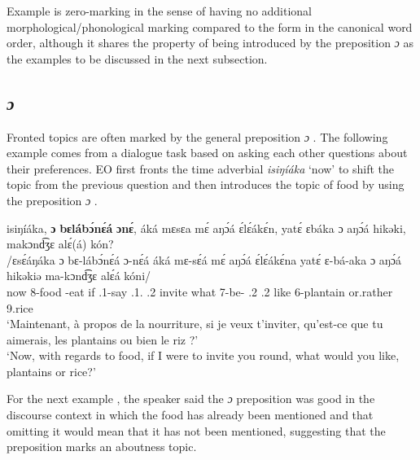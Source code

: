 \documentclass[output=paper,colorlinks,citecolor=brown
]{langscibook}
\begin{document}
\z

Example  is zero-marking in the sense of having no additional morphological\slash phonological marking compared to the form in the canonical word order, although it shares the property of being introduced by the preposition \textit{ɔ} as the examples to be discussed in the next subsection.

\subsection{\textit{ɔ}}

Fronted topics are often marked by the general preposition \textit{ɔ} \PREP{}. The following example comes from a dialogue task based on asking each other questions about their preferences. EO first fronts the time adverbial \textit{isiŋíáka} `now' to shift the topic from the previous question and then introduces the topic of food by using the preposition \textit{ɔ} .

\ea
\label{alternativeqplantainrice}
\glll
{\db}isiŋíáka, \textbf{ɔ} \textbf{bɛlábɔ́nɛ́á} \textbf{ɔnɛ́}, áká mɛsɛa mɛ́ aŋɔ́á ɛ́lɛ́ákɛ́n, yatɛ́ ɛbáka ɔ aŋɔ́á hikəki, makɔnd͡ʒɛ alɛ́(á) kón? \\
/ɛsɛ́áŋáka ɔ bɛ-lábɔ́nɛ́á ɔ-nɛ́á áká mɛ-sɛ́á mɛ́ aŋɔ́á ɛ́lɛ́ákɛ́na yatɛ́ ɛ-bá-aka ɔ aŋɔ́á hikəkiə ma-kɔnd͡ʒɛ alɛ́á kóni/ \\
{\db}now \PREP{} 8-food \INF{}-eat if \SM{}.1\SG{}-say \SM{}.1\SG{}.\SBJV{} \PRO{}.2\SG{} invite what 7\SM{}-be-\DUR{} \SM{}.2\SG{} \PRO{}.2\SG{} like 6-plantain or.rather 9.rice \\
\glt
`Maintenant, à propos de la nourriture, si je veux t'inviter, qu'est-ce que tu aimerais, les plantains ou bien le riz ?' \\ `Now, with regards to food, if I were to invite you round, what would you like, plantains or rice?' \jambox*{[EO 966] }

\z

For the next example , the speaker said the \textit{ɔ} preposition was good in the discourse context in which the food has already been mentioned and that omitting it would mean that it has not been mentioned, suggesting that the preposition marks an aboutness topic.
\end{document}
